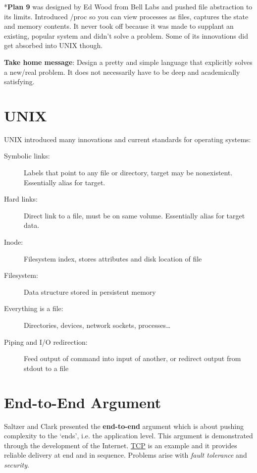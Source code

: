 \documentclass[twoside]{article}
\begin{document}
\begin{footnotesize}
*\textbf{Plan 9} was designed by Ed Wood from Bell Labs and pushed file abstraction to its limits. Introduced /proc so you can view processes as files, captures the state and memory contents. It never took off because it was made to supplant an existing, popular system and didn't solve a problem. Some of its innovations did get absorbed into UNIX though.\\
\end{footnotesize}


\textbf{Take home message}: Design a pretty and simple language that explicitly solves a new/real problem. It does not necessarily have to be deep and academically satisfying. 
\section{UNIX}
UNIX introduced many innovations and current standards for operating systems:
\begin{description}
\item[Symbolic links:] Labels that point to any file or directory, target may be
  nonexistent. Essentially alias for target.
\item[Hard links:] Direct link to a file, must be on same volume. Essentially
  alias for target data.
\item[Inode:] Filesystem index, stores attributes and disk location of file
\item[Filesystem:] Data structure stored in persistent memory
\item[Everything is a file:] Directories, devices, network sockets,
  processes\ldots
\item[Piping and I/O redirection:] Feed output of command into input of another,
  or redirect output from stdout to a file
\end{description}
\section{End-to-End Argument}
Saltzer and Clark presented the \textbf{end-to-end} argument which is about pushing complexity to the `ends', i.e. the application level. This argument is demonstrated through the development of the Internet. \underline{TCP} is an example and it provides reliable delivery at end and in sequence. Problems arise with \emph{fault tolerance} and \emph{security}. 
\end{document}
